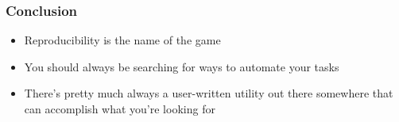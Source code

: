 \documentclass[english,xcolor=dvipsnames]{beamer}
\newcommand{\bi}{\begin{itemize}}
\newcommand{\ei}{\end{itemize}}
\begin{document}
\begin{frame}
\frametitle{Conclusion}
   \bi 
   \item Reproducibility is the name of the game
   \item You should always be searching for ways to automate your tasks
   \item There's pretty much always a user-written utility out there somewhere that can accomplish what you're looking for
   \ei
\end{frame}
\end{document}
